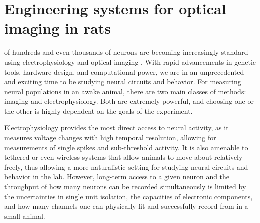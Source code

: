 


\chapter{Engineering systems for optical imaging in rats}
 of hundreds and even thousands of neurons are becoming increasingly standard using electrophysiology \cite{Steinmetz2019, Siegle2021, Stringer2019SpontaneousActivity} and optical imaging \cite{Stringer2019High-dimensionalCortex, Weisenburger2019, Sofroniew2016}. With rapid advancements in genetic tools, hardware design, and computational power, we are in an unprecedented and exciting time to be studying neural circuits and behavior. For measuring neural populations in an awake animal, there are two main classes of methods: imaging and electrophysiology. Both are extremely powerful, and choosing one or the other is highly dependent on the goals of the experiment. 

Electrophysiology provides the most direct access to neural activity, as it measures voltage changes with high temporal resolution, allowing for measurements of single spikes and sub-threshold activity. It is also amenable to tethered or even wireless systems that allow animals to move about relatively freely, thus allowing a more naturalistic setting for studying neural circuits and behavior in the lab. However, long-term access to a given neuron and the throughput of how many neurons can be recorded simultaneously is limited by the uncertainties in single unit isolation, the capacities of electronic components, and how many channels one can physically fit and successfully record from in a small animal. 

